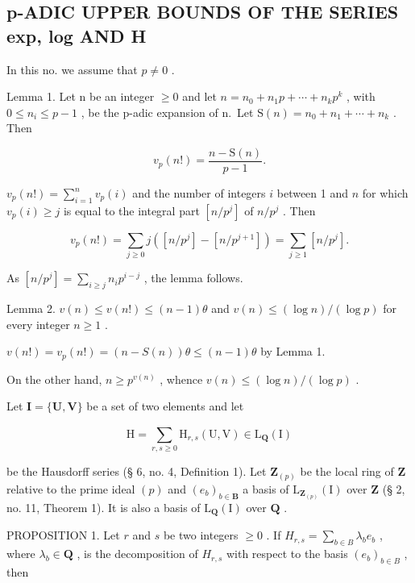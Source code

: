 \subsection{p-ADIC UPPER BOUNDS OF THE SERIES exp, log AND H}

In this no. we assume that \(p \neq 0\) .

Lemma 1. Let n be an integer \(\geqslant0\) and let \(n=n_{0}+n_{1}p+\cdots+n_{k}p^{k}\) , with \(0\leqslant n_{i}\leqslant p-1\) , be the p-adic expansion of n.~Let \(\mathrm{S}(n)=n_{0}+n_{1}+\cdots+n_{k}\) . Then

\[
v _ {p} (n!) = \frac {n - \mathrm{S} (n)}{p - 1}.\tag{3}
\]

\(v_{p}(n!) = \sum_{i=1}^{n} v_{p}(i)\) and the number of integers \(i\) between 1 and \(n\) for which \(v_{p}(i) \geqslant j\) is equal to the integral part \([n/p^{j}]\) of \(n/p^{j}\) . Then

\[
v _ {p} (n!) = \sum_ {j \geqslant 0} j ([ n / p ^ {j} ] - [ n / p ^ {j + 1} ]) = \sum_ {j \geqslant 1} [ n / p ^ {j} ].
\]

As \([n / p^j] = \sum_{i\geqslant j}n_i p^{i - j}\) , the lemma follows.

Lemma 2. \(v(n) \leqslant v(n!) \leqslant (n - 1)\theta\) and \(v(n) \leqslant (\log n) / (\log p)\) for every integer \(n \geqslant 1\) .

\(v(n!) = v_{p}(n!) = (n - S(n))\theta \leqslant (n - 1)\theta\) by Lemma 1.

On the other hand, \(n \geqslant p^{v(n)}\) , whence \(v(n) \leqslant (\log n) / (\log p)\) .

Let \(\mathbf{I} = \{\mathbf{U},\mathbf{V}\}\) be a set of two elements and let

\[
\mathrm{H} = \sum_ {r, s \geqslant 0} \mathrm{H} _ {r, s} (\mathrm{U}, \mathrm{V}) \in \hat {\mathrm{L}} _ {\mathbf {Q}} (\mathrm{I})
\]

be the Hausdorff series (§ 6, no. 4, Definition 1). Let \(\mathbf{Z}_{(p)}\) be the local ring of \(\mathbf{Z}\) relative to the prime ideal \((p)\) and \((e_b)_{b \in \mathbf{B}}\) a basis of \(\mathrm{L}_{\mathbf{Z}_{(p)}}(\mathrm{I})\) over \(\mathbf{Z}\) (§ 2, no. 11, Theorem 1). It is also a basis of \(\mathrm{L}_{\mathbf{Q}}(\mathrm{I})\) over \(\mathbf{Q}\) .

PROPOSITION 1. Let \(r\) and \(s\) be two integers \(\geqslant 0\) . If \(H_{r,s} = \sum_{b \in B} \lambda_b e_b\) , where \(\lambda_b \in \mathbf{Q}\) , is the decomposition of \(H_{r,s}\) with respect to the basis \((e_b)_{b \in B}\) , then

